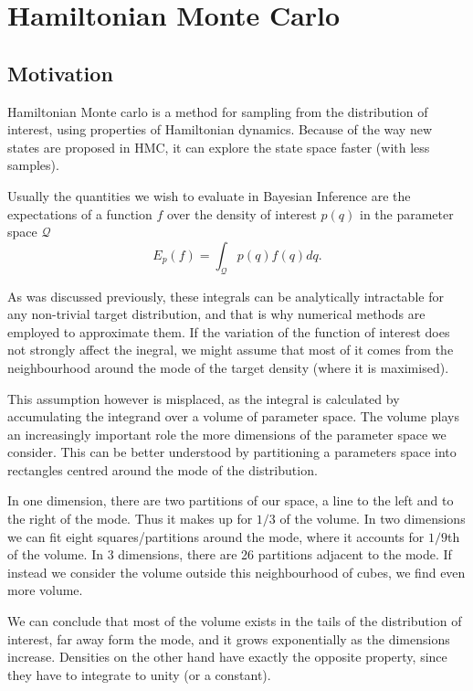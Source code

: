 \section{Hamiltonian Monte Carlo}
\subsection{Motivation}

Hamiltonian Monte carlo is a method for sampling from the distribution of interest, using properties of Hamiltonian dynamics. Because of the way new states are proposed in HMC, it can explore the state space faster (with less samples).

Usually the quantities we wish to evaluate in Bayesian Inference are the expectations of a function $f$ over the density of interest $p(q)$ in the parameter space $\mathcal{Q}$
\begin{equation}
	E_p(f) = \int_{\mathcal{Q}}p(q)f(q)dq.
\end{equation}

As was discussed previously, these integrals can be analytically intractable for any non-trivial target distribution, and that is why numerical methods are employed to approximate them. If the variation of the function of interest does not strongly affect the inegral, we might assume that most of it comes from the neighbourhood around the mode of the target density (where it is maximised).

This assumption however is misplaced, as the integral is calculated by accumulating the integrand over a volume of parameter space. The volume plays an increasingly important role the more dimensions of the parameter space we consider. This can be better understood by partitioning a parameters space into rectangles centred around the mode of the distribution. 

In one dimension, there are two partitions of our space, a line to the left and to the right of the mode. Thus it makes up for $1/3$ of the volume. In two dimensions we can fit eight squares/partitions around the mode, where it accounts for $1/9$th of the volume. In 3 dimensions, there are 26 partitions adjacent to the mode. If instead we consider the volume outside this neighbourhood of cubes, we find even more volume. 

We can conclude that most of the volume exists in the tails of the distribution of interest, far away form the mode, and it grows exponentially as the dimensions increase. Densities on the other hand have exactly the opposite property, since they have to integrate to unity (or a constant). 


